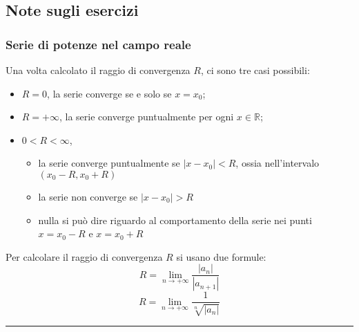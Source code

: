 \subsection*{Note sugli esercizi}
\subsubsection*{Serie di potenze nel campo reale}
Una volta calcolato il raggio di convergenza $R$, ci sono tre casi possibili:
\begin{itemize}
    \item $R = 0$, la serie converge se e solo se $x = x_0$;
    \item $R = +\infty$, la serie converge puntualmente per ogni $x \in \mathbb{R}$;
    \item $0 < R < \infty$, \begin{itemize}
        \item la serie converge puntualmente se $|x-x_0| < R$, ossia nell'intervalo $(x_0-R, x_0 + R)$
        \item la serie non converge se $|x-x_0| > R$
        \item nulla si può dire riguardo al comportamento della serie nei punti $x = x_0 - R$ e $x= x_0+R$
    \end{itemize}
\end{itemize}
Per calcolare il raggio di convergenza $R$ si usano due formule:
\[
    R = \lim_{n\rightarrow +\infty} \frac{|a_n|}{|a_{n+1}|}
\]
\[
    R = \lim_{n\rightarrow +\infty} \frac{1}{\sqrt[n]{|a_n|}}
\]
\rule{\textwidth}{2pt}
